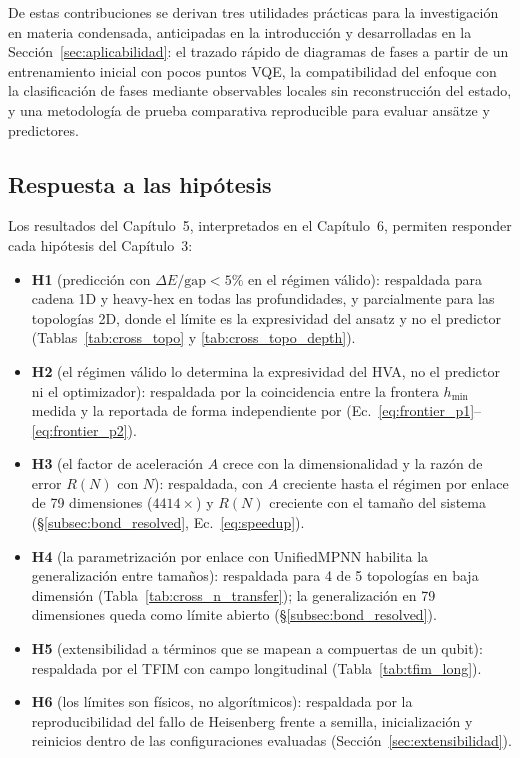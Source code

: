 \documentclass[11pt,a4paper,spanish]{book}
\begin{document}
De estas contribuciones se derivan tres utilidades prácticas para la investigación en materia condensada, anticipadas en la introducción y desarrolladas en la Sección~\ref{sec:aplicabilidad}: el trazado rápido de diagramas de fases a partir de un entrenamiento inicial con pocos puntos VQE, la compatibilidad del enfoque con la clasificación de fases mediante observables locales sin reconstrucción del estado, y una metodología de prueba comparativa reproducible para evaluar ansätze y predictores.

\subsection{Respuesta a las hipótesis}

Los resultados del Capítulo~5, interpretados en el Capítulo~6, permiten responder cada hipótesis del Capítulo~3:

\begin{itemize}
    \item \textbf{H1} (predicción con $\Delta E/\text{gap} < 5\%$ en el régimen válido): respaldada para cadena 1D y heavy-hex en todas las profundidades, y parcialmente para las topologías 2D, donde el límite es la expresividad del ansatz y no el predictor (Tablas~\ref{tab:cross_topo} y \ref{tab:cross_topo_depth}).
    \item \textbf{H2} (el régimen válido lo determina la expresividad del HVA, no el predictor ni el optimizador): respaldada por la coincidencia entre la frontera $h_{\min}$ medida y la reportada de forma independiente por \citet{tripathi2026} (Ec.~\ref{eq:frontier_p1}--\ref{eq:frontier_p2}).
    \item \textbf{H3} (el factor de aceleración $A$ crece con la dimensionalidad y la razón de error $R(N)$ con $N$): respaldada, con $A$ creciente hasta el régimen por enlace de 79 dimensiones ($4414\times$) y $R(N)$ creciente con el tamaño del sistema (§\ref{subsec:bond_resolved}, Ec.~\ref{eq:speedup}).
    \item \textbf{H4} (la parametrización por enlace con UnifiedMPNN habilita la generalización entre tamaños): respaldada para 4 de 5 topologías en baja dimensión (Tabla~\ref{tab:cross_n_transfer}); la generalización en 79 dimensiones queda como límite abierto (§\ref{subsec:bond_resolved}).
    \item \textbf{H5} (extensibilidad a términos que se mapean a compuertas de un qubit): respaldada por el TFIM con campo longitudinal (Tabla~\ref{tab:tfim_long}).
    \item \textbf{H6} (los límites son físicos, no algorítmicos): respaldada por la reproducibilidad del fallo de Heisenberg frente a semilla, inicialización y reinicios dentro de las configuraciones evaluadas (Sección~\ref{sec:extensibilidad}).
\end{itemize}
\end{document}
